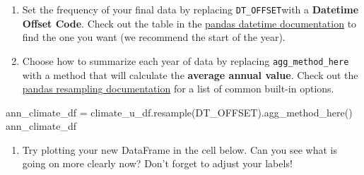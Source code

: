 \documentclass[
  letterpaper,
  DIV=11,
  numbers=noendperiod,
  oneside]{scrreprt}
\newenvironment{Shaded}{\begin{snugshade}}{\end{snugshade}}
\newcommand{\NormalTok}[1]{\textcolor[rgb]{0.00,0.23,0.31}{#1}}
\newcommand{\OperatorTok}[1]{\textcolor[rgb]{0.37,0.37,0.37}{#1}}
\newcommand{\StringTok}[1]{\textcolor[rgb]{0.13,0.47,0.30}{#1}}
\providecommand{\tightlist}{%
  \setlength{\itemsep}{0pt}\setlength{\parskip}{0pt}}
\begin{document}
\begin{tcolorbox}[enhanced jigsaw, colbacktitle=quarto-callout-color!10!white, opacityback=0, bottomtitle=1mm, toptitle=1mm, bottomrule=.15mm, left=2mm, colframe=quarto-callout-color-frame, leftrule=.75mm, opacitybacktitle=0.6, colback=white, rightrule=.15mm, toprule=.15mm, breakable, titlerule=0mm, title=\textcolor{quarto-callout-color}{\faInfo}\hspace{0.5em}{Try It: Resample}, coltitle=black, arc=.35mm]

\begin{enumerate}
\def\labelenumi{\arabic{enumi}.}
\tightlist
\item
  Set the frequency of your final data by replacing
  \texttt{DT\_OFFSET}with a \textbf{Datetime Offset Code}. Check out the
  table in the
  \href{https://pandas.pydata.org/pandas-docs/stable/user_guide/timeseries.html\#dateoffset-objects}{pandas
  datetime documentation} to find the one you want (we recommend the
  start of the year).
\item
  Choose how to summarize each year of data by replacing
  \texttt{agg\_method\_here} with a method that will calculate the
  \textbf{average annual value}. Check out the
  \href{https://pandas.pydata.org/pandas-docs/stable/user_guide/timeseries.html\#basics}{pandas
  resampling documentation} for a list of common built-in options.
\end{enumerate}

\end{tcolorbox}

\begin{Shaded}
\begin{Highlighting}[]
\NormalTok{ann\_climate\_df }\OperatorTok{=}\NormalTok{ climate\_u\_df.resample(}\StringTok{\textquotesingle{}DT\_OFFSET\textquotesingle{}}\NormalTok{).agg\_method\_here()}
\NormalTok{ann\_climate\_df}
\end{Highlighting}
\end{Shaded}

\begin{tcolorbox}[enhanced jigsaw, colbacktitle=quarto-callout-color!10!white, opacityback=0, bottomtitle=1mm, toptitle=1mm, bottomrule=.15mm, left=2mm, colframe=quarto-callout-color-frame, leftrule=.75mm, opacitybacktitle=0.6, colback=white, rightrule=.15mm, toprule=.15mm, breakable, titlerule=0mm, title=\textcolor{quarto-callout-color}{\faInfo}\hspace{0.5em}{Try It: Plot Annual Data}, coltitle=black, arc=.35mm]

\begin{enumerate}
\def\labelenumi{\arabic{enumi}.}
\tightlist
\item
  Try plotting your new DataFrame in the cell below. Can you see what is
  going on more clearly now? Don't forget to adjust your labels!
\end{enumerate}

\end{tcolorbox}
\end{document}
